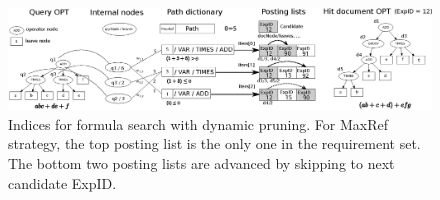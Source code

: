 \documentclass[runningheads]{llncs}
\begin{document}
\begin{figure}[!t]
\begin{center}
\includegraphics[width=\textwidth]{fig/drawing.eps}
\caption{Indices for formula search with dynamic pruning. For MaxRef strategy, the top posting list is the only one in the requirement set. The bottom two posting lists are advanced by skipping to next candidate ExpID.}
\label{figillu}
\end{center}
\end{figure}
\end{document}

